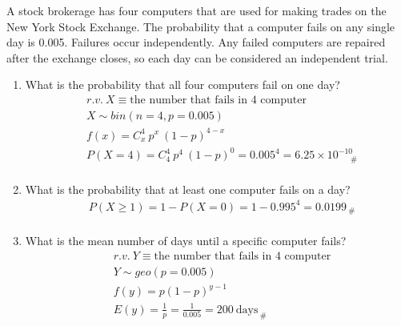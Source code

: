A stock brokerage has four computers that are used for making trades on the New York Stock Exchange. The probability that a computer fails on any single day is 0.005. Failures occur independently. Any failed computers are repaired after the exchange closes, so each day can be considered an independent trial.
    \begin{enumerate}
        \item What is the probability that all four computers fail on one day?
            \begin{align*}
                &r.v. \ X \equiv \text{the number that fails in 4 computer}\\
                &X \sim bin(n = 4, p = 0.005)\\
                &f(x) = C_x^4 \ p^x\ (1-p)^{4-x}\\
                &P(X = 4) = C_4^4 \ p^4\ (1-p)^{0} = 0.005^{4} = 6.25 \times 10^{-10}_{\ \ \ \ \ \ \ \#}\\
            \end{align*}

        \item What is the probability that at least one computer fails on a day?
            \begin{align*}
                &P(X \geq 1) = 1 - P(X = 0) = 1 - 0.995^4 = 0.0199_{ \ \#}\\
            \end{align*}

        \item What is the mean number of days until a specific computer fails?
            \begin{align*}
                &r.v. \ Y \equiv \text{the number that fails in 4 computer}\\
                &Y \sim geo(p = 0.005)\\
                &f(y) = p(1-p)^{y-1}\\
                &E(y) = \frac{1}{p} = \frac{1}{0.005} = 200 \ \text{days}_{ \ \#}\\
            \end{align*}
        
    \end{enumerate}

